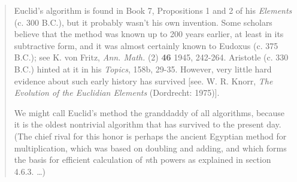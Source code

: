 \begin{quote}
Euclid's algorithm is found in Book 7, Propositions 1 and 2 of his
\emph{Elements} (c. 300 B.C.), but it probably wasn't his own
invention.  Some scholars believe that the method was known up to
200 years earlier, at least in its subtractive form, and it
was almost certainly known to Eudoxus (c. 375 B.C.); see
K. von Fritz, \emph{Ann. Math.} (2) \textbf{46} 1945, 242-264.
Aristotle (c. 330 B.C.) hinted at it in his \emph{Topics}, 158b,
29-35.  However, very little hard evidence about such early history
has survived [see. W. R. Knorr, \emph{The Evolution of the Euclidian
Elements} (Dordrecht:  1975)].

We might call Euclid's method the granddaddy of all algorithms, because
it is the oldest nontrivial algorithm that has survived to the present day.
(The chief rival for this honor is perhaps the ancient Egyptian method
for multiplication, which was based on doubling and adding, and which forms
the basis for efficient calculation of \emph{n}th powers as explained
in section 4.6.3.  \ldots{})
\end{quote}

